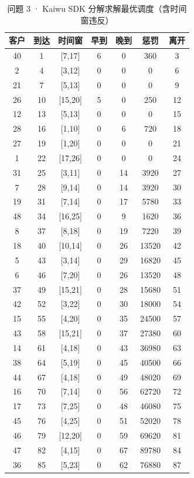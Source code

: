 \begin{table}[htbp]
\centering
\caption{问题 3 · Kaiwu SDK 分解求解最优调度（含时间窗违反）}\label{tab:q3_kaiwu_schedule}
\small
\begin{tabular}{ccccccc}
\toprule
客户 & 到达 & 时间窗 & 早到 & 晚到 & 惩罚 & 离开 \\
\midrule
40 & 1 & [7,17] & 6 & 0 & 360 & 3 \\
2 & 4 & [3,12] & 0 & 0 & 0 & 6 \\
21 & 7 & [5,13] & 0 & 0 & 0 & 9 \\
26 & 10 & [15,20] & 5 & 0 & 250 & 12 \\
12 & 13 & [5,13] & 0 & 0 & 0 & 15 \\
28 & 16 & [1,10] & 0 & 6 & 720 & 18 \\
27 & 19 & [1,20] & 0 & 0 & 0 & 21 \\
1 & 22 & [17,26] & 0 & 0 & 0 & 24 \\
31 & 25 & [3,11] & 0 & 14 & 3920 & 27 \\
7 & 28 & [9,14] & 0 & 14 & 3920 & 30 \\
19 & 31 & [7,14] & 0 & 17 & 5780 & 33 \\
48 & 34 & [16,25] & 0 & 9 & 1620 & 36 \\
8 & 37 & [8,18] & 0 & 19 & 7220 & 39 \\
18 & 40 & [10,14] & 0 & 26 & 13520 & 42 \\
5 & 43 & [3,14] & 0 & 29 & 16820 & 45 \\
6 & 46 & [7,20] & 0 & 26 & 13520 & 48 \\
37 & 49 & [15,21] & 0 & 28 & 15680 & 51 \\
42 & 52 & [3,22] & 0 & 30 & 18000 & 54 \\
15 & 55 & [4,20] & 0 & 35 & 24500 & 57 \\
43 & 58 & [15,21] & 0 & 37 & 27380 & 60 \\
14 & 61 & [4,18] & 0 & 43 & 36980 & 63 \\
38 & 64 & [5,19] & 0 & 45 & 40500 & 66 \\
44 & 67 & [4,18] & 0 & 49 & 48020 & 69 \\
16 & 70 & [7,14] & 0 & 56 & 62720 & 72 \\
17 & 73 & [7,25] & 0 & 48 & 46080 & 75 \\
45 & 76 & [4,25] & 0 & 51 & 52020 & 78 \\
46 & 79 & [12,20] & 0 & 59 & 69620 & 81 \\
47 & 82 & [4,15] & 0 & 67 & 89780 & 84 \\
36 & 85 & [5,23] & 0 & 62 & 76880 & 87 \\

\end{tabular}
\end{table}
